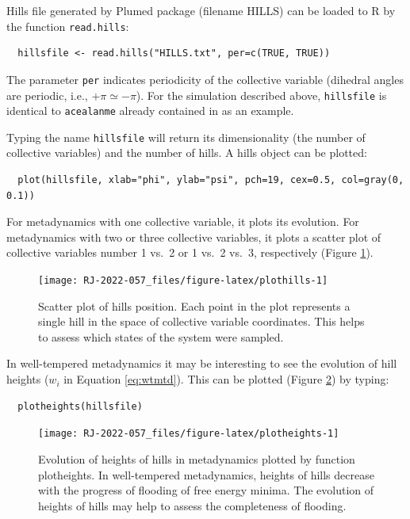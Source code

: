 Hills file generated by Plumed package (filename HILLS) can be loaded to R by
the function \texttt{read.hills}:

\begin{verbatim}
  hillsfile <- read.hills("HILLS.txt", per=c(TRUE, TRUE))
\end{verbatim}

The parameter \texttt{per} indicates periodicity of the collective variable (dihedral angles
are periodic, i.e., \(+\pi \simeq -\pi\)).
For the simulation described above, \texttt{hillsfile} is identical
to \texttt{acealanme} already contained in  as
an example.

Typing the name \texttt{hillsfile} will return its dimensionality (the number of collective variables) and
the number of hills. A hills object can be plotted:

\begin{verbatim}
  plot(hillsfile, xlab="phi", ylab="psi", pch=19, cex=0.5, col=gray(0, 0.1))
\end{verbatim}

For metadynamics with one collective variable, it plots its evolution. For metadynamics
with two or three collective variables, it plots a scatter plot of collective variables
number 1 vs.~2 or 1 vs.~2 vs.~3, respectively (Figure \ref{fig:plothills}).

\begin{figure}

{\centering \texttt{[image: RJ-2022-057\_files/figure-latex/plothills-1]} 

}

\caption{Scatter plot of hills position. Each point in the plot represents a single hill in the space of collective variable coordinates. This helps to assess which states of the system were sampled.}\label{fig:plothills}
\end{figure}

In well-tempered metadynamics it may be interesting to see the evolution
of hill heights (\(w_i\) in Equation \eqref{eq:wtmtd}).
This can be plotted (Figure \ref{fig:plotheights}) by typing:

\begin{verbatim}
  plotheights(hillsfile)
\end{verbatim}

\begin{figure}

{\centering \texttt{[image: RJ-2022-057\_files/figure-latex/plotheights-1]} 

}

\caption{Evolution of heights of hills in metadynamics plotted by function plotheights. In well-tempered metadynamics, heights of hills decrease with the progress of flooding of free energy minima. The evolution of heights of hills may help to assess the completeness of flooding.}\label{fig:plotheights}
\end{figure}

